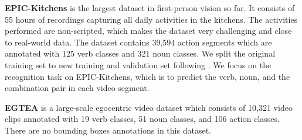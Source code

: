 \documentclass[letterpaper]{article} \usepackage{aaai20}  \usepackage{times}  \usepackage{helvet} \usepackage{courier}  \usepackage[hyphens]{url}  \usepackage{graphicx} \urlstyle{rm} \def\UrlFont{\rm}  \usepackage{graphicx}  \frenchspacing  \setlength{\pdfpagewidth}{8.5in}  \setlength{\pdfpageheight}{11in}  \usepackage{amsfonts,amssymb}
\begin{document}
\textbf{EPIC-Kitchens} is the largest dataset in first-person vision so far. It consists of 55 hours of recordings capturing all daily activities in the kitchens. The activities performed are non-scripted, which makes the dataset very challenging and close to real-world data. The dataset contains 39,594 action segments which are annotated with 125 verb classes and 321 noun classes. We split the original training set to new training and validation set following \cite{Baradel2018ObjectLV}. We focus on the recognition task on EPIC-Kitchens, which is to predict the verb, noun, and the combination pair in each video segment.

\textbf{EGTEA} is a large-scale egocentric video dataset which consists of 10,321 video clips annotated with 19 verb classes, 51 noun classes, and 106 action classes. There are no bounding boxes annotations in this dataset. 
\end{document}
